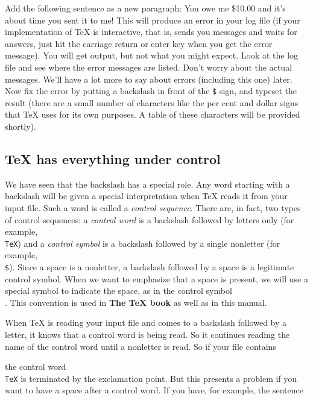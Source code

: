 \exercise Add the following sentence as a new paragraph: 
\beginuser 
You owe me \$10.00 and it's about time you sent it to me! 
\enduser 
\noindent 
This will produce an error in your log file (if your 
implementation of \TeX{} is interactive, that is, sends you 
messages and waits for answers, just hit the carriage return or 
enter key when you get the error message). You will get output, 
but not what you might expect. Look at the log file and see 
where the error messages are listed. Don't worry about the 
actual messages. We'll have a lot more to say about errors 
(including this one) later. Now fix the error by putting a 
backslash in front of the {\tt \$} sign, and typeset the result 
(there are a small number of characters like the per cent and 
dollar signs that \TeX{} uses for its own purposes. A table of 
these characters will be provided shortly). 

\subsection{\TeX{} has everything under control} 

We have seen that the backslash has a special role. Any word 
starting with a backslash will be given a special interpretation 
when \TeX{} reads it from your input file. Such a word is called 
a {\sl control sequence}. There are, in fact, two types of 
control sequences: a {\sl control word\/} is a backslash followed 
by letters only (for example, {\tt \\TeX}) and a {\sl control 
symbol\/} is a backslash followed by a single nonletter (for 
example, {\tt \\\$})\null. Since a space is a nonletter, a 
backslash followed by a space is a legitimate control symbol. 
When we want to emphasize that a space is present, we will use a 
special symbol {\tt\sp} to indicate the space, as in the control 
symbol {\tt\\\sp}.  This convention is used in {\bf The \TeX 
book} as well as in this manual. 

When \TeX{} is reading your input file and comes to a backslash 
followed by a letter, it knows that a control word is being 
read. So it continues reading the name of the control word until 
a nonletter is read. So if your file contains 


\noindent 
the control word {\tt \\TeX} is terminated by the exclamation 
point. But this presents a problem if you want to have a space 
after a control word. If you have, for example, the sentence 

